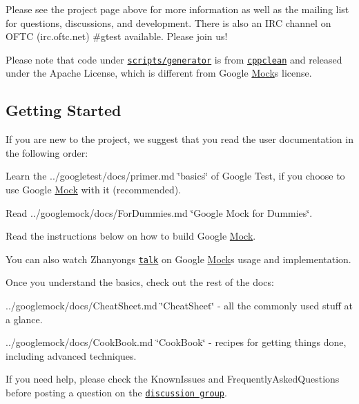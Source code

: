 Please see the project page above for more information as well as the mailing list for questions, discussions, and development. There is also an I\+RC channel on O\+F\+TC (irc.\+oftc.\+net) \#gtest available. Please join us!

Please note that code under \href{scripts/generator/}{\tt scripts/generator} is from \href{http://code.google.com/p/cppclean/}{\tt cppclean} and released under the Apache License, which is different from Google \hyperlink{classMock}{Mock}\textquotesingle{}s license.

\subsection*{Getting Started}

If you are new to the project, we suggest that you read the user documentation in the following order\+:


\begin{DoxyItemize}
\item Learn the ../googletest/docs/primer.md \char`\"{}basics\char`\"{} of Google Test, if you choose to use Google \hyperlink{classMock}{Mock} with it (recommended).
\item Read ../googlemock/docs/\+For\+Dummies.md \char`\"{}\+Google Mock for Dummies\char`\"{}.
\item Read the instructions below on how to build Google \hyperlink{classMock}{Mock}.
\end{DoxyItemize}

You can also watch Zhanyong\textquotesingle{}s \href{http://www.youtube.com/watch?v=sYpCyLI47rM}{\tt talk} on Google \hyperlink{classMock}{Mock}\textquotesingle{}s usage and implementation.

Once you understand the basics, check out the rest of the docs\+:


\begin{DoxyItemize}
\item ../googlemock/docs/\+Cheat\+Sheet.md \char`\"{}\+Cheat\+Sheet\char`\"{} -\/ all the commonly used stuff at a glance.
\item ../googlemock/docs/\+Cook\+Book.md \char`\"{}\+Cook\+Book\char`\"{} -\/ recipes for getting things done, including advanced techniques.
\end{DoxyItemize}

If you need help, please check the Known\+Issues and Frequently\+Asked\+Questions before posting a question on the \href{http://groups.google.com/group/googlemock}{\tt discussion group}.

